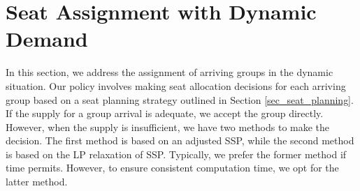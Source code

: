 \section{Seat Assignment with Dynamic Demand}\label{sec_dynamic}



In this section, we address the assignment of arriving groups in the dynamic situation. Our policy involves making seat allocation decisions for each arriving group based on a seat planning strategy outlined in Section \ref{sec_seat_planning}. If the supply for a group arrival is adequate, we accept the group directly. However, when the supply is insufficient, we have two methods to make the decision. The first method is based on an adjusted SSP, while the second method is based on the LP relaxation of SSP. Typically, we prefer the former method if time permits. However, to ensure consistent computation time, we opt for the latter method.






